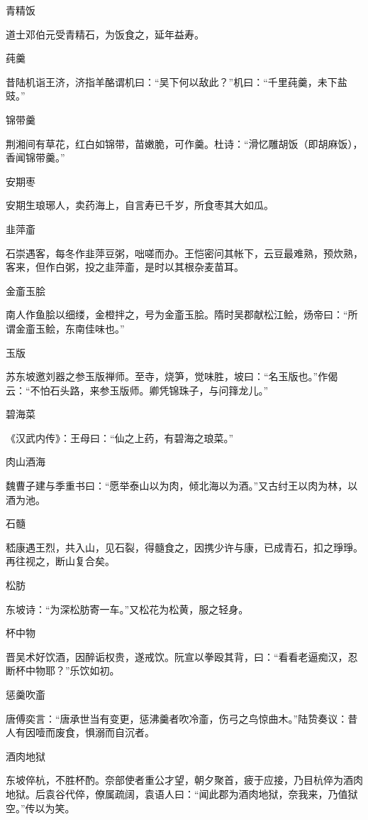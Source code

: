 \documentclass[a4paper,12pt,UTF8,twoside]{ctexbook}
\begin{document}
    青精饭
    
    道士邓伯元受青精石，为饭食之，延年益寿。
    
    莼羹
    
    昔陆机诣王济，济指羊酪谓机曰：“吴下何以敌此？”机曰：“千里莼羹，未下盐豉。”
    
    锦带羹
    
    荆湘间有草花，红白如锦带，苗嫩脆，可作羹。杜诗：“滑忆雕胡饭（即胡麻饭），香闻锦带羹。”
    
    安期枣
    
    安期生琅琊人，卖药海上，自言寿已千岁，所食枣其大如瓜。
    
    韭萍齑
    
    石崇遇客，每冬作韭萍豆粥，咄嗟而办。王恺密问其帐下，云豆最难熟，预炊熟，客来，但作白粥，投之韭萍齑，是时以其根杂麦苗耳。
    
    金齑玉脍
    
    南人作鱼脍以细缕，金橙拌之，号为金齑玉脍。隋时吴郡献松江鲙，炀帝曰：“所谓金齑玉鲙，东南佳味也。”
    
    玉版
    
    苏东坡邀刘器之参玉版禅师。至寺，烧笋，觉味胜，坡曰：“名玉版也。”作偈云：“不怕石头路，来参玉版师。卿凭锦珠子，与问箨龙儿。”
    
    碧海菜
    
    《汉武内传》：王母曰：“仙之上药，有碧海之琅菜。”
    
    肉山酒海
    
    魏曹子建与季重书曰：“愿举泰山以为肉，倾北海以为酒。”又古纣王以肉为林，以酒为池。
    
    石髓
    
    嵇康遇王烈，共入山，见石裂，得髓食之，因携少许与康，已成青石，扣之琤琤。再往视之，断山复合矣。
    
    松肪
    
    东坡诗：“为深松肪寄一车。”又松花为松黄，服之轻身。
    
    杯中物
    
    晋吴术好饮酒，因醉诟权贵，遂戒饮。阮宣以拳殴其背，曰：“看看老逼痴汉，忍断杯中物耶？”乐饮如初。
    
    惩羹吹齑
    
    唐傅奕言：“唐承世当有变更，惩沸羹者吹冷齑，伤弓之鸟惊曲木。”陆贽奏议：昔人有因噎而废食，惧溺而自沉者。
    
    酒肉地狱
    
    东坡倅杭，不胜杯酌。奈部使者重公才望，朝夕聚首，疲于应接，乃目杭倅为酒肉地狱。后袁谷代倅，僚属疏阔，袁语人曰：“闻此郡为酒肉地狱，奈我来，乃值狱空。”传以为笑。
    
\end{document}
